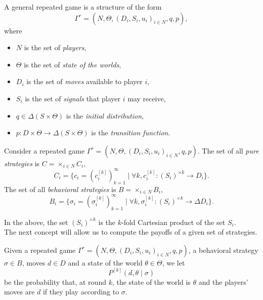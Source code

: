\begin{definition}
A general repeated game is a structure of the form
$$\Gamma^r = (N, \Theta, (D_i, S_i, u_i)_{i \in N}, q, p), $$
where
\begin{itemize}
\item $N$ is the set of \emph{players},
\item $\Theta$ is the set of \emph{state of the worlds},
\item $D_i$ is the set of \emph{moves} available to player $i$,
\item $S_i$ is the set of \emph{signals} that player $i$ may receive,
\item $q \in \Delta(S \times \Theta)$ is the \emph{initial distribution},
\item $p : D \times \Theta \rightarrow \Delta(S \times \Theta) $ is the \emph{transition function}.
\end{itemize}
\end{definition}

\begin{definition}[Strategy]
Consider a repeated game $\Gamma^r = (N, \Theta, (D_i, S_i, u_i)_{i \in N}, q, p).$
The set of all \emph{pure strategies} is $C = \times_{i \in N} C_i$,
$$C_i = \{ c_i = (c_i^{[k]})_{k = 1}^{\infty} \mid \forall k , c_i^{[k]} : (S_i)^{\times k} \rightarrow D_i\}. $$
The set of all \emph{behavioral strategies} is $B = \times_{i \in N} B_i$,
$$B_i = \{ \sigma_i = (\sigma_i^{[k]})_{k = 1}^{\infty} \mid \forall k , \sigma_i^{[k]} : (S_i)^{\times k} \rightarrow \Delta D_i\}. $$
\end{definition}
In the above, the set $(S_i)^{\times k}$ is the $k$-fold Cartesian product of the set $S_i$.\\
The next concept will allow us to compute the payoffs of a given set of strategies.
\begin{definition}
Given a repeated game $\Gamma^r = (N, \Theta, (D_i, S_i, u_i)_{i \in N}, q, p)$, a behavioral strategy $\sigma \in B$,
moves $d \in D$ and a state of the world $\theta \in \Theta$, we let
$$ P^{[k]}(d,\theta \mid \sigma)$$
be the probability that, at round $k$, the state of the world is $\theta$ and the players' moves are $d$ if they play according to $\sigma$.
\end{definition}

